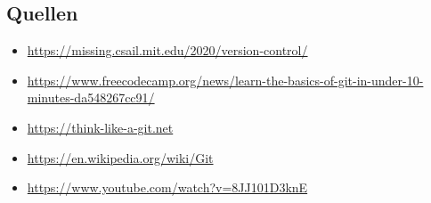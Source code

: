 \subsection{Quellen}
\begin{itemize}
	\item \url{https://missing.csail.mit.edu/2020/version-control/}
	\item  \url{https://www.freecodecamp.org/news/learn-the-basics-of-git-in-under-10-minutes-da548267cc91/}
	\item \url{https://think-like-a-git.net}
	\item \url{https://en.wikipedia.org/wiki/Git}
	\item \url{https://www.youtube.com/watch?v=8JJ101D3knE}
\end{itemize}